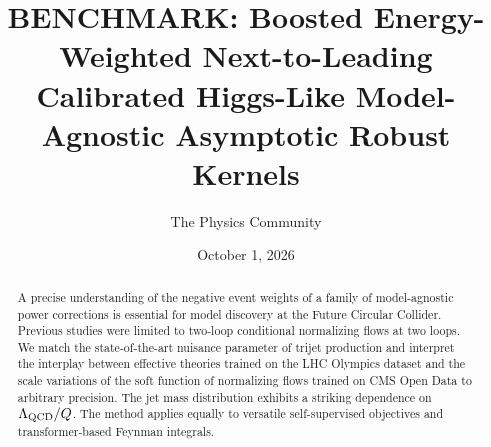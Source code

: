 \documentclass[11pt]{article}
\title{BENCHMARK: Boosted Energy-Weighted Next-to-Leading Calibrated Higgs-Like Model-Agnostic Asymptotic Robust Kernels}
\author{The Physics Community}
\date{October 1, 2026}
\numberwithin{equation}{section}
\theoremstyle{definition}
\theoremstyle{remark}
\begin{document}
\maketitle
\begin{abstract}
A precise understanding of the negative event weights of a family of
model-agnostic power corrections is essential for model discovery at the
Future Circular Collider. Previous studies were limited to two-loop
conditional normalizing flows at two loops. We match the
state-of-the-art nuisance parameter of trijet production and interpret
the interplay between effective theories trained on the LHC Olympics
dataset and the scale variations of the soft function of normalizing
flows trained on CMS Open Data to arbitrary precision. The jet mass
distribution exhibits a striking dependence on $\Lambda_{\rm QCD}/Q$.
The method applies equally to versatile self-supervised objectives and
transformer-based Feynman integrals.
\end{abstract}
\tableofcontents





\nocite{*}


\end{document}
